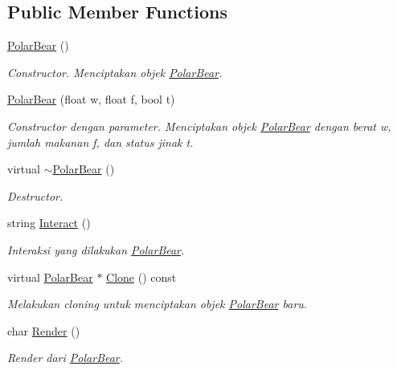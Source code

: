\subsection*{Public Member Functions}
\begin{DoxyCompactItemize}
\item 
\hyperlink{classPolarBear_a646f53f9fa472dcc7873e6a912cbc474}{Polar\+Bear} ()
\begin{DoxyCompactList}\small\item\em Constructor. Menciptakan objek \hyperlink{classPolarBear}{Polar\+Bear}. \end{DoxyCompactList}\item 
\hyperlink{classPolarBear_a361d624a7075b89f4276b35325fd66c2}{Polar\+Bear} (float w, float f, bool t)
\begin{DoxyCompactList}\small\item\em Constructor dengan parameter. Menciptakan objek \hyperlink{classPolarBear}{Polar\+Bear} dengan berat w, jumlah makanan f, dan status jinak t. \end{DoxyCompactList}\item 
virtual \hyperlink{classPolarBear_a84e510e1476910f33cbb0bbe2fff3566}{$\sim$\+Polar\+Bear} ()
\begin{DoxyCompactList}\small\item\em Destructor. \end{DoxyCompactList}\item 
string \hyperlink{classPolarBear_a2c266e69dd929ac3b10fe7484a77a5a4}{Interact} ()
\begin{DoxyCompactList}\small\item\em Interaksi yang dilakukan \hyperlink{classPolarBear}{Polar\+Bear}. \end{DoxyCompactList}\item 
virtual \hyperlink{classPolarBear}{Polar\+Bear} $\ast$ \hyperlink{classPolarBear_aad58cdb9b360996a94f12ade5b6743b7}{Clone} () const 
\begin{DoxyCompactList}\small\item\em Melakukan cloning untuk menciptakan objek \hyperlink{classPolarBear}{Polar\+Bear} baru. \end{DoxyCompactList}\item 
char \hyperlink{classPolarBear_a7feccf8999fb0ab000c052583ad0217a}{Render} ()
\begin{DoxyCompactList}\small\item\em Render dari \hyperlink{classPolarBear}{Polar\+Bear}. \end{DoxyCompactList}\end{DoxyCompactItemize}

